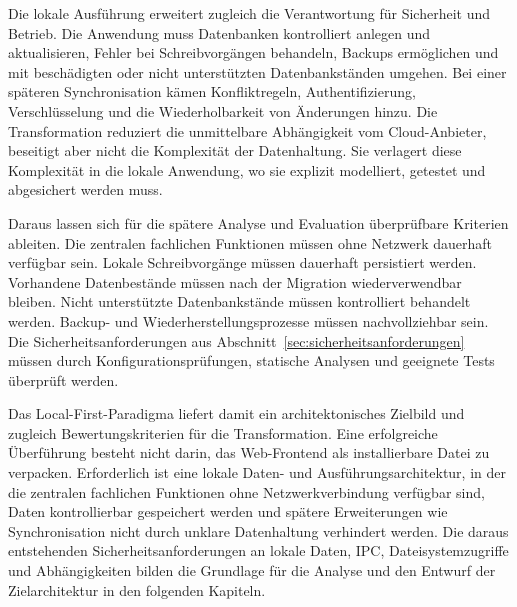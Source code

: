 Die lokale Ausführung erweitert zugleich die Verantwortung für Sicherheit und Betrieb.
Die Anwendung muss Datenbanken kontrolliert anlegen und aktualisieren, Fehler bei Schreibvorgängen behandeln, Backups ermöglichen und mit beschädigten oder nicht unterstützten Datenbankständen umgehen.
Bei einer späteren Synchronisation kämen Konfliktregeln, Authentifizierung, Verschlüsselung und die Wiederholbarkeit von Änderungen hinzu.
Die Transformation reduziert die unmittelbare Abhängigkeit vom Cloud-Anbieter, beseitigt aber nicht die Komplexität der Datenhaltung.
Sie verlagert diese Komplexität in die lokale Anwendung, wo sie explizit modelliert, getestet und abgesichert werden muss.

Daraus lassen sich für die spätere Analyse und Evaluation überprüfbare Kriterien ableiten.
Die zentralen fachlichen Funktionen müssen ohne Netzwerk dauerhaft verfügbar sein.
Lokale Schreibvorgänge müssen dauerhaft persistiert werden.
Vorhandene Datenbestände müssen nach der Migration wiederverwendbar bleiben.
Nicht unterstützte Datenbankstände müssen kontrolliert behandelt werden.
Backup- und Wiederherstellungsprozesse müssen nachvollziehbar sein.
Die Sicherheitsanforderungen aus Abschnitt~\ref{sec:sicherheitsanforderungen} müssen durch Konfigurationsprüfungen, statische Analysen und geeignete Tests überprüft werden.

Das Local-First-Paradigma liefert damit ein architektonisches Zielbild und zugleich Bewertungskriterien für die Transformation.
Eine erfolgreiche Überführung besteht nicht darin, das Web-Frontend als installierbare Datei zu verpacken.
Erforderlich ist eine lokale Daten- und Ausführungsarchitektur, in der die zentralen fachlichen Funktionen ohne Netzwerkverbindung verfügbar sind, Daten kontrollierbar gespeichert werden und spätere Erweiterungen wie Synchronisation nicht durch unklare Datenhaltung verhindert werden.
Die daraus entstehenden Sicherheitsanforderungen an lokale Daten, IPC, Dateisystemzugriffe und Abhängigkeiten bilden die Grundlage für die Analyse und den Entwurf der Zielarchitektur in den folgenden Kapiteln.
